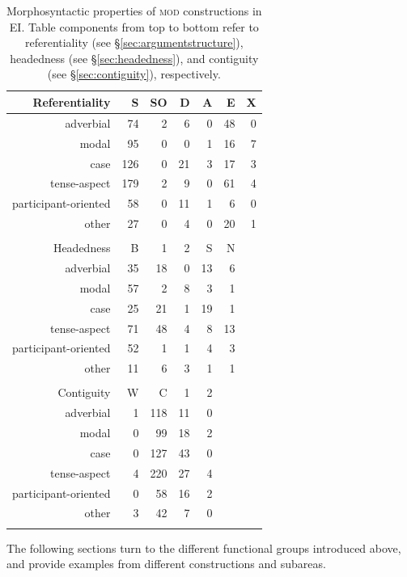 \begin{table}
\centering
\begin{tabular}{rrrrrrr}
  \lsptoprule
Referentiality & S & SO & D & A & E & X \\ 
  \hline
  adverbial &  74 &   2 &   6 &   0 &  48 &   0 \\ 
  modal &  95 &   0 &   0 &   1 &  16 &   7 \\ 
  case & 126 &   0 &  21 &   3 &  17 &   3 \\ 
  tense-aspect & 179 &   2 &   9 &   0 &  61 &   4 \\ 
  participant-oriented &  58 &   0 &  11 &   1 &   6 &   0 \\ 
  other &  27 &   0 &   4 &   0 &  20 &   1 \\ 
   \hline
 \\
  \hline
Headedness & B & 1 & 2 & S & N \\ 
  \hline
  adverbial &  35 &  18 &   0 &  13 &   6 \\ 
  modal &  57 &   2 &   8 &   3 &   1 \\ 
  case &  25 &  21 &   1 &  19 &   1 \\ 
  tense-aspect &  71 &  48 &   4 &   8 &  13 \\ 
  participant-oriented &  52 &   1 &   1 &   4 &   3 \\ 
  other &  11 &   6 &   3 &   1 &   1 \\ 
   \hline
 \\
  \hline
Contiguity & W & C & 1 & 2 \\ 
  \hline
  adverbial &   1 & 118 &  11 &   0 \\ 
  modal &   0 &  99 &  18 &   2 \\ 
  case &   0 & 127 &  43 &   0 \\ 
  tense-aspect &   4 & 220 &  27 &   4 \\ 
  participant-oriented &   0 &  58 &  16 &   2 \\ 
  other &   3 &  42 &   7 &   0 \\ 
   \lspbottomrule
\end{tabular}
\caption[Morphosyntactic properties of \textsc{mod} constructions]{Morphosyntactic properties of \textsc{mod} constructions in EI. Table components from top to bottom refer to referentiality (see §\ref{sec:argumentstructure}), headedness (see §\ref{sec:headedness}), and contiguity (see §\ref{sec:contiguity}), respectively.}
\label{table:mod_formal}
\end{table}

The following sections turn to the different functional groups introduced above, and provide examples from different constructions and subareas.

